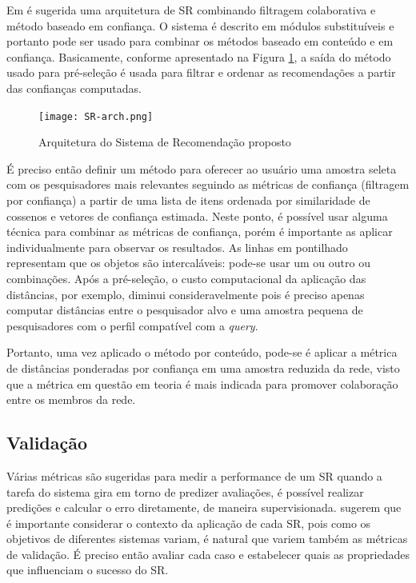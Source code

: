 \documentclass[12pt]{article}
\begin{document}
Em \cite{massa2004trust} é sugerida uma arquitetura de SR combinando filtragem colaborativa e método baseado em confiança. 
O sistema é descrito em módulos substituíveis e portanto pode ser usado para combinar os métodos baseado em conteúdo e em 
confiança. Basicamente, conforme apresentado na Figura \ref{fig:sr-arch}, a saída do método usado para pré-seleção é usada 
para filtrar e ordenar as recomendações a partir das confianças computadas.

\begin{center}
 \begin{figure}[ht]
   \texttt{[image: SR-arch.png]}
   \caption{Arquitetura do Sistema de Recomendação proposto}
   \label{fig:sr-arch}
 \end{figure}
\end{center}

É preciso então definir um método para oferecer ao usuário uma amostra seleta com os pesquisadores mais relevantes seguindo as métricas de confiança (filtragem por confiança) a partir de uma lista de itens ordenada por similaridade de cossenos e vetores de 
confiança estimada. Neste ponto, é possível usar alguma técnica para combinar as métricas de confiança, porém é importante 
as aplicar individualmente para observar os resultados. As linhas em pontilhado representam que os objetos são intercaláveis: 
pode-se usar um ou outro ou combinações. Após a pré-seleção, o custo computacional da aplicação das distâncias, por exemplo, 
diminui consideravelmente pois é preciso apenas computar distâncias entre o pesquisador alvo e uma amostra pequena de 
pesquisadores com o perfil compatível com a \textit{query}.

Portanto, uma vez aplicado o método por conteúdo, pode-se é aplicar a métrica de distâncias ponderadas por confiança em uma 
amostra reduzida da rede, visto que a métrica em questão em teoria é mais indicada para promover colaboração entre os membros da 
rede.

\subsection{Validação} \label{sect:validation}

Várias métricas são sugeridas para medir a performance de um SR quando a tarefa do sistema gira em torno de predizer avaliações, 
é possível realizar predições e calcular o erro diretamente, de maneira supervisionada. \cite{shani2011evaluating} sugerem 
que é importante considerar o contexto da aplicação de cada SR, pois como os objetivos de diferentes sistemas variam, é 
natural que variem também as métricas de validação. É preciso então avaliar cada caso e estabelecer quais as propriedades que 
influenciam o sucesso do SR.
\end{document}
